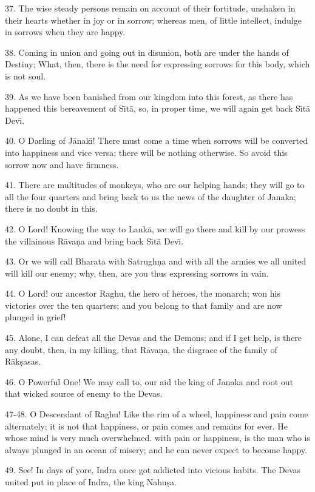 37. The wise steady persons remain on account of their fortitude, unshaken in their hearts whether in joy or in sorrow; whereas men, of little intellect, indulge in sorrows when they are happy.

38. Coming in union and going out in disunion, both are under the hands of Destiny; What, then, there is the need for expressing sorrows for this body, which is not soul.

39. As we have been banished from our kingdom into this forest, as there has happened this bereavement of S\={\i}t\=a, so, in proper time, we will again get back S\={\i}t\=a Dev\={\i}.

40. O Darling of J\=anak\={\i}! There must come a time when sorrows will be converted into happiness and vice versa; there will be nothing otherwise. So avoid this sorrow now and have firmness.

41. There are multitudes of monkeys, who are our helping hands; they will go to all the four quarters and bring back to us the news of the daughter of Janaka; there is no doubt in this.

42. O Lord! Knowing the way to Lank\=a, we will go there and kill by our prowess the villainous R\=ava\d{n}a and bring back S\={\i}t\=a Dev\={\i}.

43. Or we will call Bharata with Satrugh\d{n}a and with all the armies we all united will kill our enemy; why, then, are you thus expressing sorrows in vain.

44. O Lord! our ancestor Raghu, the hero of heroes, the monarch; won his victories over the ten quarters; and you belong to that family and are now plunged in grief!

45. Alone, I can defeat all the Devas and the Demons; and if I get help, is there any doubt, then, in my killing, that R\=ava\d{n}a, the disgrace of the family of R\=ak\d{s}asas.

46. O Powerful One! We may call to, our aid the king of Janaka and root out that wicked source of enemy to the Devas.

47-48. O Descendant of Raghu! Like the rim of a wheel, happiness and pain come alternately; it is not that happiness, or pain comes and remains for ever. He whose mind is very much overwhelmed. with pain or happiness, is the man who is always plunged in an ocean of misery; and he can never expect to become happy.

49. See! In days of yore, Indra once got addicted into vicious habits. The Devas united put in place of Indra, the king Nahu\d{s}a.

